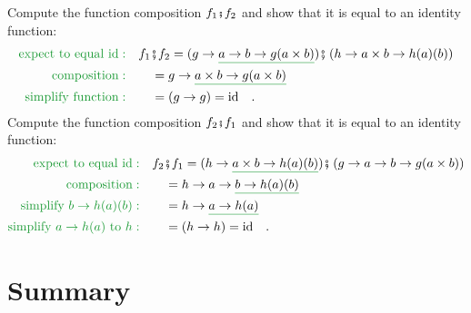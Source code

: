 Compute the function composition $f_{1}\bef f_{2}$ and show that
it is equal to an identity function:
\begin{align*}
{\color{greenunder}\text{expect to equal }\text{id}:}\quad & f_{1}\bef f_{2}=(g\rightarrow\gunderline{a\rightarrow b\rightarrow g(a\times b)})\bef\left(h\rightarrow a\times b\rightarrow h(a)(b)\right)\\
{\color{greenunder}\text{composition}:}\quad & \quad=g\rightarrow\gunderline{a\times b\rightarrow g(a\times b)}\\
{\color{greenunder}\text{simplify function}:}\quad & \quad=\left(g\rightarrow g\right)=\text{id}\quad.
\end{align*}
Compute the function composition $f_{2}\bef f_{1}$ and show that
it is equal to an identity function:
\begin{align*}
{\color{greenunder}\text{expect to equal }\text{id}:}\quad & f_{2}\bef f_{1}=(h\rightarrow\gunderline{a\times b\rightarrow h(a)(b)})\bef\left(g\rightarrow a\rightarrow b\rightarrow g(a\times b)\right)\\
{\color{greenunder}\text{composition}:}\quad & \quad=h\rightarrow a\rightarrow\gunderline{b\rightarrow h(a)(b)}\\
{\color{greenunder}\text{simplify }b\rightarrow h(a)(b):}\quad & \quad=h\rightarrow\gunderline{a\rightarrow h(a)}\\
{\color{greenunder}\text{simplify }a\rightarrow h(a)\text{ to }h:}\quad & \quad=\left(h\rightarrow h\right)=\text{id}\quad.
\end{align*}


\section{Summary}

